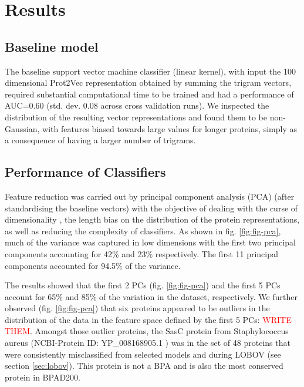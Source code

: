 \documentclass[10pt,journal,compsoc,twoside]{IEEEtran}
\begin{document}
\section{Results}
\label{sec:Results}

\subsection{Baseline model}
\label{sec:baseline}
The baseline support vector machine classifier (linear kernel), with input the 100 dimensional Prot2Vec representation obtained by summing the trigram vectors, required substantial computational time to be trained and had a performance of AUC=0.60 (std. dev. 0.08 across cross validation runs). We inspected the distribution of the resulting vector representations and found them to be non-Gaussian, with features biased towards large values for longer proteins, simply as a consequence of having a larger number of trigrams.



\subsection{Performance of Classifiers}
\label{sec:pca-hc}

Feature reduction was carried out by principal component analysis (PCA) (after standardising the baseline vectors)  with the objective of dealing with the curse of dimensionality \cite{dynamic_programming}, the length bias on the distribution of the protein representations, as well as reducing the complexity of classifiers. As shown in fig. \ref{fig:fig-pca}, much of the variance was captured in low dimensions with the first two principal components accounting for 42\% and 23\% respectively. The first 11 principal components accounted for 94.5\% of the variance. 

The results showed that the first 2 PCs (fig. \ref{fig:fig-pca}) and the first 5 PCs account for 65\% and 85\% of the variation in the dataset, respectively. We further observed (fig. \ref{fig:fig-pca}) that six proteins appeared to be outliers in the distribution of the data in the feature space defined by the first 5 PCs: \textcolor{red}{WRITE THEM}. Amongst those outlier proteins, the SasC protein from Staphylococcus aureus (NCBI-Protein ID: YP\_008168905.1 \cite{YP_008168905.1}) was in the set of 48 proteins that were consistently misclassified from selected models and during LOBOV (see section  \ref{sec:lobov}). This protein is not a BPA and is also the most conserved protein in BPAD200.
\end{document}
